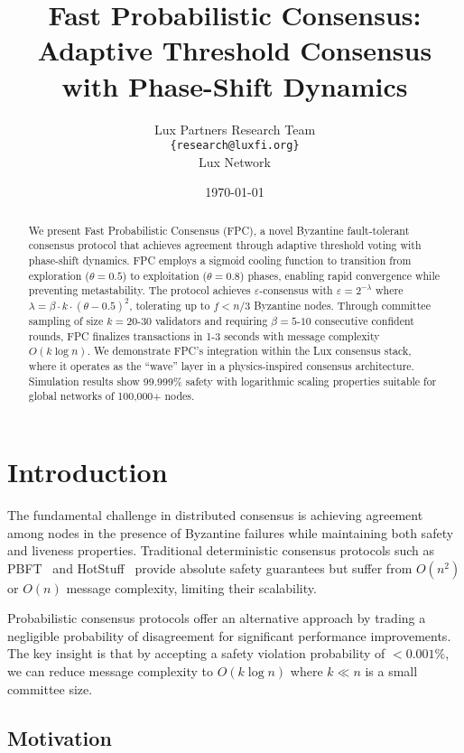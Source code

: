 \documentclass[11pt,a4paper]{article}
\title{Fast Probabilistic Consensus: Adaptive Threshold Consensus with Phase-Shift Dynamics}
\author{Lux Partners Research Team\\
\texttt{\{research@luxfi.org\}}\\
Lux Network}
\date{\today}
\begin{document}
\maketitle

\begin{abstract}
We present Fast Probabilistic Consensus (FPC), a novel Byzantine fault-tolerant consensus protocol that achieves agreement through adaptive threshold voting with phase-shift dynamics. FPC employs a sigmoid cooling function to transition from exploration ($\theta = 0.5$) to exploitation ($\theta = 0.8$) phases, enabling rapid convergence while preventing metastability. The protocol achieves $\varepsilon$-consensus with $\varepsilon = 2^{-\lambda}$ where $\lambda = \beta \cdot k \cdot (\theta - 0.5)^2$, tolerating up to $f < n/3$ Byzantine nodes. Through committee sampling of size $k = 20$-$30$ validators and requiring $\beta = 5$-$10$ consecutive confident rounds, FPC finalizes transactions in 1-3 seconds with message complexity $O(k \log n)$. We demonstrate FPC's integration within the Lux consensus stack, where it operates as the ``wave'' layer in a physics-inspired consensus architecture. Simulation results show 99.999\% safety with logarithmic scaling properties suitable for global networks of 100,000+ nodes.
\end{abstract}

\section{Introduction}

The fundamental challenge in distributed consensus is achieving agreement among nodes in the presence of Byzantine failures while maintaining both safety and liveness properties. Traditional deterministic consensus protocols such as PBFT~\cite{castro1999practical} and HotStuff~\cite{yin2019hotstuff} provide absolute safety guarantees but suffer from $O(n^2)$ or $O(n)$ message complexity, limiting their scalability.

Probabilistic consensus protocols offer an alternative approach by trading a negligible probability of disagreement for significant performance improvements. The key insight is that by accepting a safety violation probability of $< 0.001\%$, we can reduce message complexity to $O(k \log n)$ where $k \ll n$ is a small committee size.

\subsection{Motivation}
\end{document}
